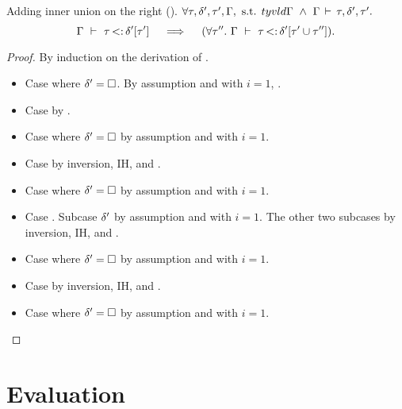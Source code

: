 \begin{lemma}{Adding inner union on the right (\textbf{\lemref{}}).}%
\label{lem:add-inner-union-right:app}
    $\forall \tau, \delta', \tau', \Gamma, \text{ s.t. }
    tyvld{}{\Gamma}\ \land\ \Gamma\,\vdash\,\tau, \delta', \tau'.$
    \[
        \subtydflt{\ty}{\plug{\dctx'}{\ty'}}
        \quad\implies\quad
        (\forall \ty''.\ \subtydflt{\ty}{\plug{\dctx'}{\tyunion{\ty'}{\ty''}}}).
    \]
\end{lemma}
\begin{proof}
    By induction on the derivation of
    .
    \begin{itemize}
        \item Case  where $\delta'=\square$. By assumption
            \subtydflt{\ty}{\tyany} and  with $i=1$,
            .
        \item Case  by .
        \item Case  where $\delta'=\square$
            by assumption and  with $i=1$.
        \item Case  by inversion, IH, and .
        \item Case  where $\delta'=\square$
            by assumption and  with $i=1$.
        \item Case . 
            Subcase $\delta'$ by assumption and  with $i=1$.
            The other two subcases by inversion, IH, and .
        \item Case  where $\delta'=\square$
            by assumption and  with $i=1$.
        \item Case  by inversion, IH, and .
        \item Case  where $\delta'=\square$
            by assumption and  with $i=1$.
    \end{itemize}
\end{proof}


\clearpage
\section{Evaluation}\label{sec:app:eval}

